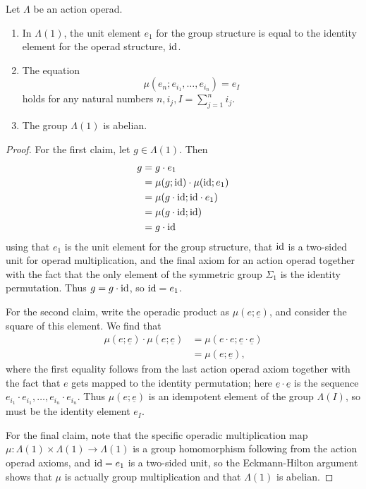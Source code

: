 \begin{lem}\label{calclem}
Let $\Lambda$ be an action operad.
\begin{enumerate}
\item In $\Lambda(1)$, the unit element $e_{1}$ for the group structure is equal to the identity element for the operad structure, $\textrm{id}$.
\item The equation
  \[
    \mu(e_{n}; e_{i_{1}}, \ldots, e_{i_{n}}) = e_{I}
  \]
holds for any natural numbers $n, i_{j}, I = \sum_{j=1}^n i_{j}$.
\item The group $\Lambda(1)$ is abelian.
\end{enumerate}
\end{lem}
\begin{proof}
For the first claim, let $g \in \Lambda(1)$. Then
  \begin{align*}
    g & = g \cdot e_{1} \\
    &= \mu(g; \textrm{id}) \cdot \mu(\textrm{id}; e_{1}) \\
    &= \mu(g \cdot \textrm{id}; \textrm{id} \cdot e_{1}) \\
    &= \mu(g \cdot \textrm{id}; \textrm{id}) \\
    &= g \cdot \textrm{id}
  \end{align*}
using that $e_{1}$ is the unit element for the group structure, that $\textrm{id}$ is a two-sided unit for operad multiplication, and the final axiom for an action operad together with the fact that the only element of the symmetric group $\Sigma_{1}$ is the identity permutation. Thus $g = g \cdot \textrm{id}$, so $\textrm{id} = e_{1}$.

For the second claim, write the operadic product as $\mu(e; \underline{e})$, and consider the square of this element. We find that
  \begin{align*}
    \mu(e; \underline{e}) \cdot \mu(e; \underline{e}) & = \mu(e \cdot e; \underline{e} \cdot \underline{e}) \\
    &= \mu(e; \underline{e}),
  \end{align*}
where the first equality follows from the last action operad axiom together with the fact that $e$ gets mapped to the identity permutation; here $\underline{e} \cdot \underline{e}$ is the sequence $e_{i_{1}} \cdot e_{i_{1}}, \ldots, e_{i_{n}} \cdot e_{i_{n}}$. Thus $\mu(e; \underline{e})$ is an idempotent element of the group $\Lambda(I)$, so must be the identity element $e_{I}$.

For the final claim, note that the specific operadic multiplication map $\mu \colon \Lambda(1) \times \Lambda(1) \rightarrow \Lambda(1)$ is a group homomorphism following from the action operad axioms, and $\textrm{id} = e_{1}$ is a two-sided unit, so the Eckmann-Hilton argument shows that $\mu$ is actually group multiplication and that $\Lambda(1)$ is abelian.
\end{proof}

